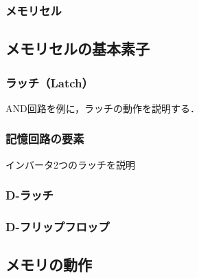         \subsubsection{メモリセル}

    \subsection{メモリセルの基本素子}
        \subsubsection{ラッチ（Latch）}
        AND回路を例に，ラッチの動作を説明する．

        \subsubsection{記憶回路の要素}
        インバータ2つのラッチを説明

        \subsubsection{D-ラッチ}

        \subsubsection{D-フリップフロップ}

    \subsection{メモリの動作}

